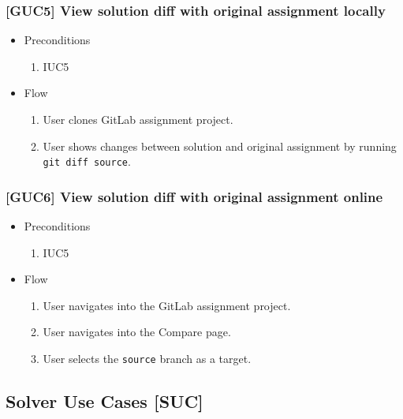 \subsubsection{{[}GUC5{]} View solution diff with original assignment locally}

\begin{itemize}
\item
  {Preconditions}
    \begin{enumerate}
    \item
      {IUC5}
    \end{enumerate}
\end{itemize}

\begin{itemize}
\item
  {Flow}
    \begin{enumerate}
    \item
      {User clones GitLab assignment project.}
    \item
      {User shows changes between solution and original assignment by running \texttt{git diff source}.}
    \end{enumerate}
\end{itemize}

\subsubsection{{[}GUC6{]} View solution diff with original assignment online}

\begin{itemize}
\item
  {Preconditions}
    \begin{enumerate}
    \item
      {IUC5}
    \end{enumerate}
\end{itemize}

\begin{itemize}
\item
  {Flow}
    \begin{enumerate}
    \item
      {User navigates into the GitLab assignment project.}
    \item
      {User navigates into the Compare page.}
    \item
      {User selects the \texttt{source} branch as a target.}
    \end{enumerate}
\end{itemize}

\subsection{Solver Use Cases {[}SUC{]}} \label{ssec:suc}

